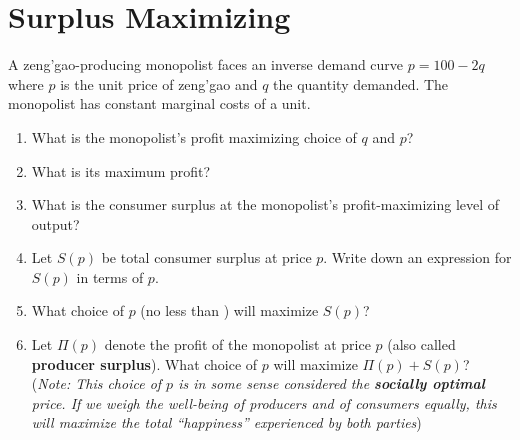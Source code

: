 \documentclass{article}
\begin{document}
\section*{Surplus Maximizing}
A zeng'gao-producing monopolist faces an inverse demand curve $p = 100 -2q$ where $p$ is the unit price of zeng'gao and $q$ the quantity demanded. The monopolist has constant marginal costs of  a unit.
\begin{enumerate}
\item What is the monopolist's profit maximizing choice of $q$ and $p$?
\item What is its maximum profit?
\item What is the consumer surplus at the monopolist's profit-maximizing level of output?
\item Let $S(p)$ be total consumer surplus at price $p$. Write down an expression for $S(p)$ in terms of $p$.
\item What choice of $p$ (no less than ) will maximize $S(p)$?
\item Let $\Pi(p)$ denote the profit of the monopolist at price $p$ (also called \textbf{producer surplus}). What choice of $p$ will maximize $\Pi(p) + S(p)$? (\emph{Note: This choice of $p$ is in some sense considered the \textbf{socially optimal} price. If we weigh the well-being of producers and of consumers equally, this will maximize the total ``happiness'' experienced by both parties})
\end{enumerate}
\end{document}
